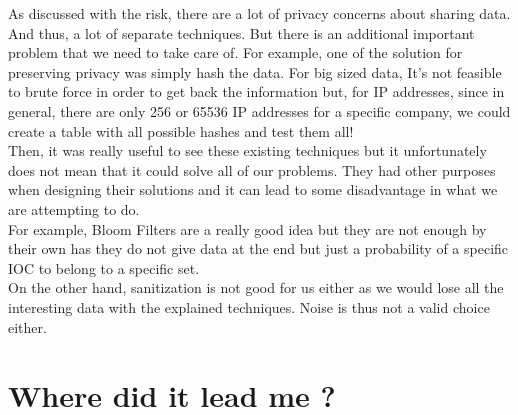 \documentclass{eplmastersthesis}
\begin{document}
As discussed with the risk, there are a lot of privacy concerns about sharing data. And thus, a lot of separate techniques. But there is an additional important problem that we need to take care of. For example, one of the solution for preserving privacy was simply hash the data. For big sized data, It's not feasible to brute force in order to get back the information but, for IP addresses, since in general, there are only 256 or 65536 IP addresses for a specific company, we could create a table with all possible hashes and test them all!\\

Then, it was really useful to see these existing techniques but it unfortunately does not mean that it could solve all of our problems. They had other purposes when designing their solutions and it can lead to some disadvantage in what we are attempting to do.\\
For example, Bloom Filters are a really good idea but they are not enough by their own has they do not give data at the end but just a probability of a specific IOC to belong to a specific set.\\
On the other hand, sanitization is not good for us either as we would lose all the interesting data with the explained techniques. Noise is thus not a valid choice either.


\section{Where did it lead me ?}
\end{document}
